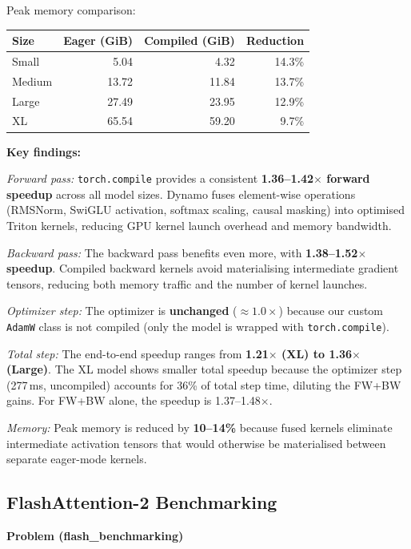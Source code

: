 \documentclass[11pt]{article}
\begin{document}
Peak memory comparison:

\begin{center}
\begin{tabular}{l r r r}
\toprule
Size & Eager (GiB) & Compiled (GiB) & Reduction \\
\midrule
Small  & 5.04 & 4.32 & 14.3\% \\
Medium & 13.72 & 11.84 & 13.7\% \\
Large  & 27.49 & 23.95 & 12.9\% \\
XL     & 65.54 & 59.20 & 9.7\% \\
\bottomrule
\end{tabular}
\end{center}

\textbf{Key findings:}

\textit{Forward pass:} \texttt{torch.compile} provides a consistent
\textbf{1.36--1.42$\times$ forward speedup} across all model sizes.
Dynamo fuses element-wise operations (RMSNorm, SwiGLU activation,
softmax scaling, causal masking) into optimised Triton kernels,
reducing GPU kernel launch overhead and memory bandwidth.

\textit{Backward pass:} The backward pass benefits even more, with
\textbf{1.38--1.52$\times$ speedup}.  Compiled backward kernels
avoid materialising intermediate gradient tensors, reducing both
memory traffic and the number of kernel launches.

\textit{Optimizer step:} The optimizer is \textbf{unchanged}
($\approx1.0\times$) because our custom \texttt{AdamW} class is
not compiled (only the model is wrapped with \texttt{torch.compile}).

\textit{Total step:} The end-to-end speedup ranges from
\textbf{1.21$\times$ (XL) to 1.36$\times$ (Large)}.  The XL model
shows smaller total speedup because the optimizer step (277\,ms,
uncompiled) accounts for 36\% of total step time, diluting the
FW+BW gains.  For FW+BW alone, the speedup is 1.37--1.48$\times$.

\textit{Memory:} Peak memory is reduced by \textbf{10--14\%} because
fused kernels eliminate intermediate activation tensors that would
otherwise be materialised between separate eager-mode kernels.

\subsection{FlashAttention-2 Benchmarking}
\textbf{Problem (flash\_benchmarking)}
\end{document}
